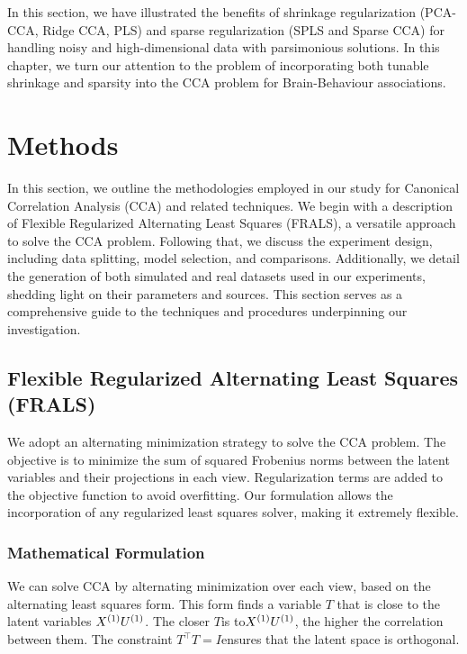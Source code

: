 In this section, we have illustrated the benefits of shrinkage regularization (PCA-CCA, Ridge CCA, PLS) and sparse regularization (SPLS and Sparse CCA) for handling noisy and high-dimensional data with parsimonious solutions.
In this chapter, we turn our attention to the problem of incorporating both tunable shrinkage and sparsity into the CCA problem for Brain-Behaviour associations.

\section{Methods}

In this section, we outline the methodologies employed in our study for Canonical Correlation Analysis (CCA) and related techniques.
We begin with a description of Flexible Regularized Alternating Least Squares (FRALS), a versatile approach to solve the CCA problem.
Following that, we discuss the experiment design, including data splitting, model selection, and comparisons.
Additionally, we detail the generation of both simulated and real datasets used in our experiments, shedding light on their parameters and sources.
This section serves as a comprehensive guide to the techniques and procedures underpinning our investigation.

\subsection{Flexible Regularized Alternating Least Squares (FRALS)}\label{subsec:flexible-regularized-alternating-least
-squares-(frals)}

We adopt an alternating minimization strategy to solve the CCA problem.
The objective is to minimize the sum of squared Frobenius norms between the latent variables and their projections in each view.
Regularization terms are added to the objective function to avoid overfitting.
Our formulation allows the incorporation of any regularized least squares solver, making it extremely flexible.

\subsubsection{Mathematical Formulation}
We can solve CCA by alternating minimization over each view, based on the alternating least squares form.
This form finds a variable \( T \) that is close to the latent variables \( X^{(1)} U^{(1)} \).
The closer \( T \)is to\( X^{(1)} U^{(1)} \), the higher the correlation between them.
The constraint \( T^\top T = I \)ensures that the latent space is orthogonal.

